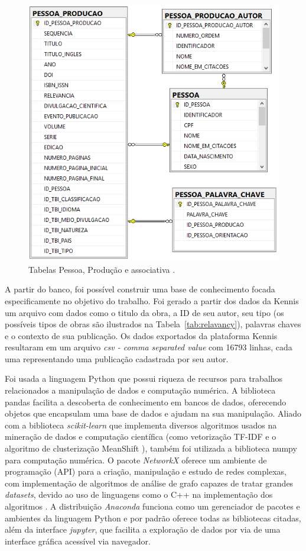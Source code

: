 \documentclass[12pt]{article}
\begin{document}
\begin{figure}[ht]
    \centering
    \includegraphics[width=.55\textwidth]{database.png}
    \caption{Tabelas Pessoa, Produção e associativa \cite{prass2019parser}.}\label{fig:database}
\end{figure}
 
A partir do banco, foi possível construir uma base de conhecimento focada especificamente no objetivo do trabalho. Foi gerado a partir dos dados da Kennis um arquivo com dados como o titulo da obra, a ID de seu autor, seu tipo (os possíveis tipos de obras são ilustrados na Tabela~\ref{tab:relavancy}), palavras chaves e o contexto de sua publicação. Os dados exportados da plataforma Kennis resultaram em um arquivo \textit{csv - comma separated value} com 16793 linhas, cada uma representando uma publicação cadastrada por seu autor.

Foi usada a linguagem Python que possui riqueza de recursos para trabalhos relacionados a manipulação de dados e computação numérica. A biblioteca pandas facilita a descoberta de conhecimento em bancos de dados, oferecendo objetos que encapsulam uma base de dados e ajudam na sua manipulação. Aliado com a biblioteca \textit{scikit-learn} que implementa diversos algoritmos usados na mineração de dados e computação científica (como vetorização TF-IDF e o algoritmo de clusterização MeanShift \cite{scikit-learn}), também foi utilizada a biblioteca numpy para computação numérica. O pacote \textit{NetworkX} oferece um ambiente de programação (API) para a criação, manipulação e estudo de redes complexas, com implementação de algoritmos de análise de grafo capazes de tratar grandes \textit{datasets}, devido ao uso de linguagens como o C++ na implementação dos algoritmos \cite{networkx2008}. A distribuição \textit{Anaconda} funciona como um gerenciador de pacotes e ambientes da linguagem Python e por padrão oferece todas as bibliotecas citadas, além da interface \textit{jupyter}, que facilita a exploração de dados por via de uma interface gráfica acessível via navegador.
\end{document}
